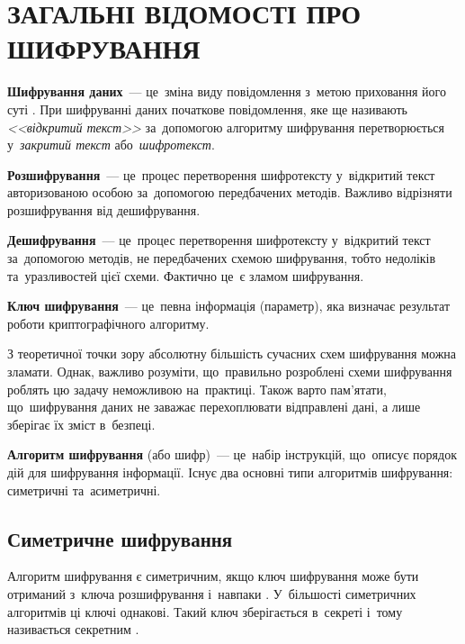 \documentclass[a4paper,oneside,titlepage,14pt]{extarticle}
\begin{document}
	\section{ЗАГАЛЬНІ ВІДОМОСТІ ПРО ШИФРУВАННЯ}
		\textbf{Шифрування даних}~--- це~зміна виду повідомлення з~метою приховання його суті \cite{appliedcrypto}. При шифруванні даних початкове повідомлення, яке ще називають \textit{<<відкритий текст>>} за~допомогою алгоритму шифрування перетворюється у~\textit{закритий текст} або~\textit{шифротекст}.\par
		
		\textbf{Розшифрування}~--- це~процес перетворення шифротексту у~відкритий текст авторизованою особою за~допомогою передбачених методів. Важливо відрізняти розшифрування від дешифрування.\par
		
		\textbf{Дешифрування}~--- це~процес перетворення шифротексту у~відкритий текст за~допомогою методів, не передбачених схемою шифрування, тобто недоліків та~уразливостей цієї схеми. Фактично це~є зламом шифрування.\par
		
		\textbf{Ключ шифрування}~--- це~певна інформація (параметр), яка визначає результат роботи криптографічного алгоритму.\par
		
		З теоретичної точки зору абсолютну більшість сучасних схем шифрування можна зламати. Однак, важливо розуміти, що~правильно розроблені схеми шифрування роблять цю задачу неможливою на~практиці. Також варто пам'ятати, що~шифрування даних не заважає перехоплювати відправлені дані, а лише зберігає їх зміст в~безпеці.\par
		
		\textbf{Алгоритм шифрування} (або шифр)~--- це~набір інструкцій, що~описує порядок дій для шифрування інформації. Існує два основні типи алгоритмів шифрування: симетричні та~асиметричні.\par
			
		\subsection{Симетричне шифрування}
			Алгоритм шифрування є симетричним, якщо ключ шифрування може бути отриманий з~ключа розшифрування і~навпаки \cite{appliedcrypto}. У~більшості симетричних алгоритмів ці ключі однакові. Такий ключ зберігається в~секреті і~тому називається секретним \cite{delfs2007introduction}.\par
			
\end{document}
